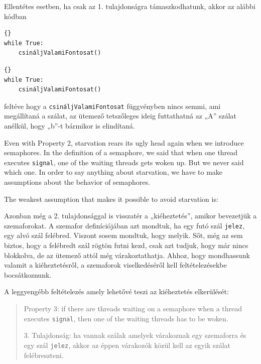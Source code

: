 \documentclass{book}
\begin{document}
Ellentétes esetben, ha csak az 1. tulajdonságra támaszkodhatunk,
akkor az alábbi kódban

\begin{minipage}[t]{2in}
\begin{lstlisting}[title={„A” szál}]{}
while True:
    csináljValamiFontosat()
\end{lstlisting}
\end{minipage}
\hfill
\begin{minipage}[t]{2in}
\begin{lstlisting}[title={„B” szál}]{}
while True:
    csináljValamiFontosat()
\end{lstlisting}
\end{minipage}

feltéve hogy a {\tt csináljValamiFontosat} függvényben
nincs semmi, ami megállítaná a szálat, az ütemező
tetszőleges ideig futtathatná az „A” szálat anélkül,
hogy „b”-t bármikor is elindítaná.


Even with Property 2, starvation rears its ugly head again
when we introduce semaphores.  In the definition of a semaphore,
we said that when one thread executes {\tt signal}, one of
the waiting threads gets woken up.  But we never said which one.
In order to say anything about starvation, we have to
make assumptions about the behavior of semaphores.

The weakest assumption that makes it possible to avoid
starvation is:


Azonban még a 2. tulajdonsággal is visszatér a „kiéheztetés”, amikor bevezetjük a szemaforokat.
A szemafor definíciójában azt mondtuk, ha egy futó szál {\tt jelez},
egy alvó szál felébred. Viszont sosem mondtuk, hogy melyik. Sőt,
még az sem biztos, hogy a felébredt szál rögtön futni kezd, csak
azt tudjuk, hogy már nincs blokkolva, de az ütemező attól még várakoztathatja.
Ahhoz, hogy mondhassunk valamit a kiéheztetésről, a szemaforok viselkedéséről
kell feltételezésekbe bocsátkoznunk.

A leggyengébb feltételezés amely lehetővé teszi az kiéheztetés elkerülését:

\begin{quote}
Property 3: if there are threads waiting on a semaphore when
a thread executes {\tt signal}, then one of the waiting threads
has to be woken.

3. Tulajdonság: ha vannak szálak amelyek várakoznak egy szemaforra
és egy szál {\tt jelez}, akkor az éppen várakozók közül kell az
egyik szálat felébreszteni.
\end{quote}
\end{document}
